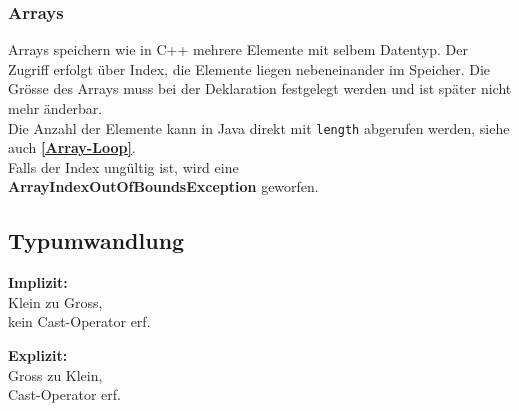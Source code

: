 \subsubsection{Arrays}
Arrays speichern wie in C++ mehrere Elemente mit selbem Datentyp. Der Zugriff erfolgt über Index, die Elemente liegen nebeneinander im Speicher.
Die Grösse des Arrays muss bei der Deklaration festgelegt werden und ist später nicht mehr änderbar.\\
Die Anzahl der Elemente kann in Java direkt mit \verb|length| abgerufen werden, siehe auch \textbf{\ref{Array-Loop}}.\\
Falls der Index ungültig ist, wird eine\\
\textbf{ArrayIndexOutOfBoundsException} geworfen.

\subsection{Typumwandlung}

\begin{minipage}{0.4\columnwidth}
    \textbf{Implizit:}\\
    Klein zu Gross,\\
    kein Cast-Operator erf.\\
    
\end{minipage}
\begin{minipage}{0.55\columnwidth}
    \textbf{Explizit:}\\
    Gross zu Klein,\\
    Cast-Operator erf.\\
    
\end{minipage}

